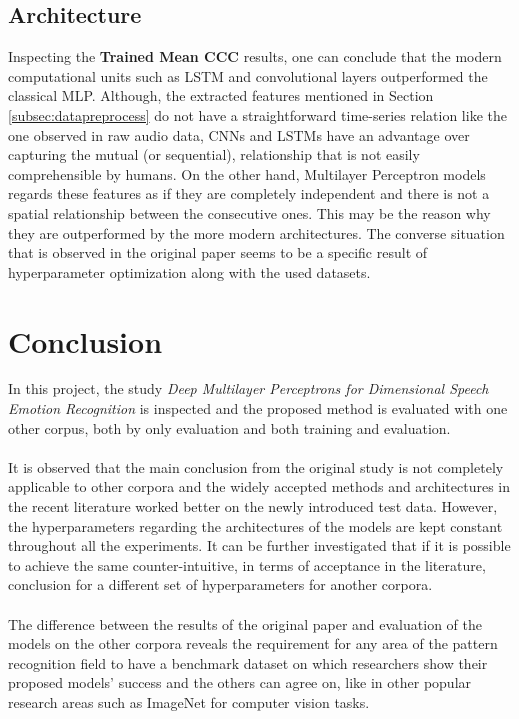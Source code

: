 \documentclass[a4paper,11pt]{article}
\begin{document}
\subsection{Architecture}
Inspecting the \textbf{Trained Mean CCC} results, one can conclude that the modern computational units such as LSTM and convolutional layers outperformed the classical MLP. Although, the extracted features mentioned in Section \ref{subsec:datapreprocess} do not have a straightforward time-series relation like the one observed in raw audio data, CNNs and LSTMs have an advantage over capturing the mutual (or sequential), relationship that is not easily comprehensible by humans. On the other hand, Multilayer Perceptron models regards these features as if they are completely independent and there is not a spatial relationship between the consecutive ones. This may be the reason why they are outperformed by the more modern architectures. The converse situation that is observed in the original paper seems to be a specific result of hyperparameter optimization along with the used datasets.

\section{Conclusion}

In this project, the study \textit{Deep Multilayer Perceptrons for Dimensional Speech Emotion Recognition} is inspected and the proposed method is evaluated with one other corpus, both by only evaluation and both training and evaluation.
\\
\\
It is observed that the main conclusion from the original study is not completely applicable to other corpora and the widely accepted methods and architectures in the recent literature worked better on the newly introduced test data. However, the hyperparameters regarding the architectures of the models are kept constant throughout all the experiments. It can be further investigated that if it is possible to achieve the same counter-intuitive, in terms of acceptance in the literature, conclusion for a different set of hyperparameters for another corpora. 
\\
\\
The difference between the results of the original paper and evaluation of the models on the other corpora reveals the requirement for any area of the pattern recognition field to have a benchmark dataset on which researchers show their proposed models' success and the others can agree on, like in other popular research areas such as ImageNet for computer vision tasks. 

\pagebreak

\printbibliography[heading=bibintoc]
\end{document}

